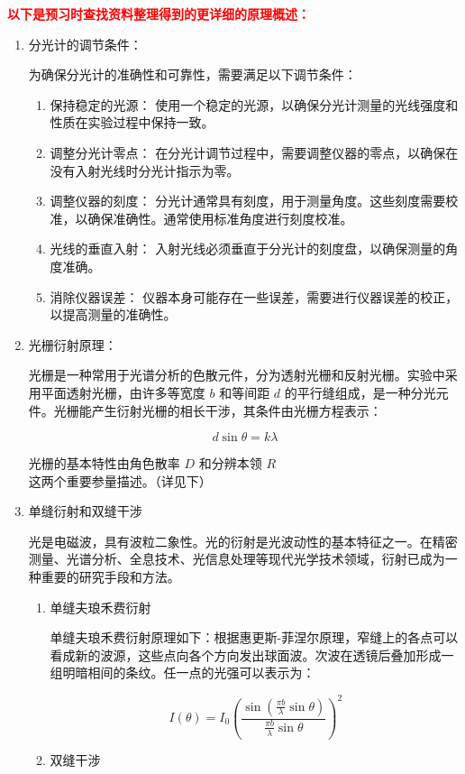 \documentclass[dvipsnames, svgnames,a4paper,11pt]{article}
\begin{document}
	
	\textcolor{red}{\textbf{以下是预习时查找资料整理得到的更详细的原理概述：}}
	
	
	\begin{enumerate}
		\item 分光计的调节条件：
		
		为确保分光计的准确性和可靠性，需要满足以下调节条件：
		\begin{enumerate}
			\item 保持稳定的光源： 使用一个稳定的光源，以确保分光计测量的光线强度和性质在实验过程中保持一致。
			\item 调整分光计零点： 在分光计调节过程中，需要调整仪器的零点，以确保在没有入射光线时分光计指示为零。
			\item 调整仪器的刻度： 分光计通常具有刻度，用于测量角度。这些刻度需要校准，以确保准确性。通常使用标准角度进行刻度校准。
			\item 光线的垂直入射： 入射光线必须垂直于分光计的刻度盘，以确保测量的角度准确。
			\item 消除仪器误差： 仪器本身可能存在一些误差，需要进行仪器误差的校正，以提高测量的准确性。
		\end{enumerate}
		\item 光栅衍射原理：
		
		光栅是一种常用于光谱分析的色散元件，分为透射光栅和反射光栅。实验中采用平面透射光栅，由许多等宽度 \(b\) 和等间距 \(d\) 的平行缝组成，是一种分光元件。光栅能产生衍射光栅的相长干涉，其条件由光栅方程表示：
		
		\[
		d\sin\theta = k\lambda
		\]
		
		光栅的基本特性由角色散率 \(D\) 和分辨本领 \(R\) 这两个重要参量描述。（详见下）
		
		\item 单缝衍射和双缝干涉
		
		光是电磁波，具有波粒二象性。光的衍射是光波动性的基本特征之一。在精密测量、光谱分析、全息技术、光信息处理等现代光学技术领域，衍射已成为一种重要的研究手段和方法。
		\begin{enumerate}
			\item 单缝夫琅禾费衍射
			
			单缝夫琅禾费衍射原理如下：根据惠更斯-菲涅尔原理，窄缝上的各点可以看成新的波源，这些点向各个方向发出球面波。次波在透镜后叠加形成一组明暗相间的条纹。任一点的光强可以表示为：
			
			\[
			I(\theta) = I_0 \left(\frac{\sin\left(\frac{\pi b}{\lambda}\sin\theta\right)}{\frac{\pi b}{\lambda}\sin\theta}\right)^2
			\]
			
			\item 双缝干涉
			

\end{enumerate}
\end{enumerate}
\end{document}
